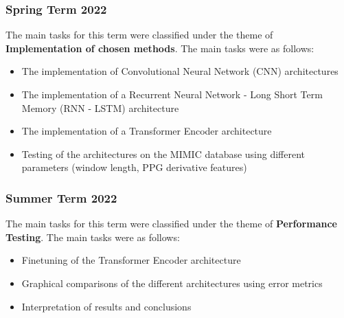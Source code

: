 \subsubsection{Spring Term 2022}
The main tasks for this term were classified under the theme of \textbf{Implementation of chosen methods}. The main tasks were as follows:
\begin{itemize}
    \item The implementation of Convolutional Neural Network (CNN) architectures    
    \item The implementation of a Recurrent Neural Network - Long Short Term Memory (RNN - LSTM) architecture
    \item The implementation of a Transformer Encoder architecture
    \item Testing of the architectures on the MIMIC database using different parameters (window length, PPG derivative features)
\end{itemize}

\subsubsection{Summer Term 2022}
The main tasks for this term were classified under the theme of \textbf{Performance Testing}. The main tasks were as follows:
\begin{itemize}
    \item Finetuning of the Transformer Encoder architecture
    \item Graphical comparisons of the different architectures using error metrics
    \item Interpretation of results and conclusions 
\end{itemize}